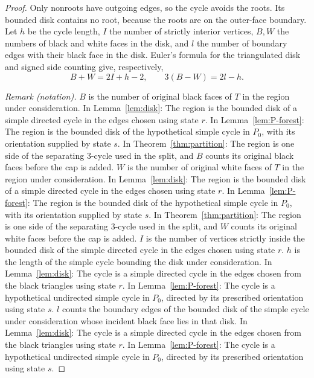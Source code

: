 \documentclass[11pt]{article}
\theoremstyle{remark}
\numberwithin{equation}{section}
\begin{document}
\begin{proof}
Only nonroots have outgoing edges, so the cycle avoids the
roots. Its bounded disk contains no root, because the roots
are on the outer-face boundary. Let \(h\) be the cycle length,
\(I\) the number of strictly interior vertices, \(B,W\) the
numbers of black and white faces in the disk, and \(l\) the
number of boundary edges with their black face in the disk.
Euler's formula for the triangulated disk and signed side
counting give, respectively,
\begin{equation}\label{eq:disk-counts}
 B+W=2I+h-2,\qquad 3(B-W)=2l-h.
\end{equation}

\noindent\textit{Remark (notation).} $B$ is the number of original black faces of $T$ in the region under consideration. In Lemma~\ref{lem:disk}: The region is the bounded disk of a simple directed cycle in the edges chosen using state $r$. In Lemma~\ref{lem:P-forest}: The region is the bounded disk of the hypothetical simple cycle in $P_0$, with its orientation supplied by state $s$. In Theorem~\ref{thm:partition}: The region is one side of the separating $3$-cycle used in the split, and $B$ counts its original black faces before the cap is added. $W$ is the number of original white faces of $T$ in the region under consideration. In Lemma~\ref{lem:disk}: The region is the bounded disk of a simple directed cycle in the edges chosen using state $r$. In Lemma~\ref{lem:P-forest}: The region is the bounded disk of the hypothetical simple cycle in $P_0$, with its orientation supplied by state $s$. In Theorem~\ref{thm:partition}: The region is one side of the separating $3$-cycle used in the split, and $W$ counts its original white faces before the cap is added. $I$ is the number of vertices strictly inside the bounded disk of the simple directed cycle in the edges chosen using state $r$. $h$ is the length of the simple cycle bounding the disk under consideration. In Lemma~\ref{lem:disk}: The cycle is a simple directed cycle in the edges chosen from the black triangles using state $r$. In Lemma~\ref{lem:P-forest}: The cycle is a hypothetical undirected simple cycle in $P_0$, directed by its prescribed orientation using state $s$. $l$ counts the boundary edges of the bounded disk of the simple cycle under consideration whose incident black face lies in that disk. In Lemma~\ref{lem:disk}: The cycle is a simple directed cycle in the edges chosen from the black triangles using state $r$. In Lemma~\ref{lem:P-forest}: The cycle is a hypothetical undirected simple cycle in $P_0$, directed by its prescribed orientation using state $s$.



\end{proof}
\end{document}
